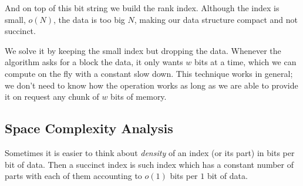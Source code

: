 And on top of this bit string we build the rank index.
Although the index is small, $o(N)$, the data is too big $N$, making our data structure compact and not succinct.

We solve it by keeping the small index but dropping the data.
Whenever the algorithm asks for a block the data, it only wants $w$ bits at a time, which we can compute on the fly with a constant slow down.
This technique works in general; we don't need to know how the operation works as long as we are able to provide it on request any chunk of $w$ bits of memory.

\subsection{Space Complexity Analysis}

Sometimes it is easier to think about \emph{density} of an index (or its part) in bits per bit of data.
Then a succinct index is such index which has a constant number of parts with each of them accounting to $o(1)$ bits per $1$ bit of data.